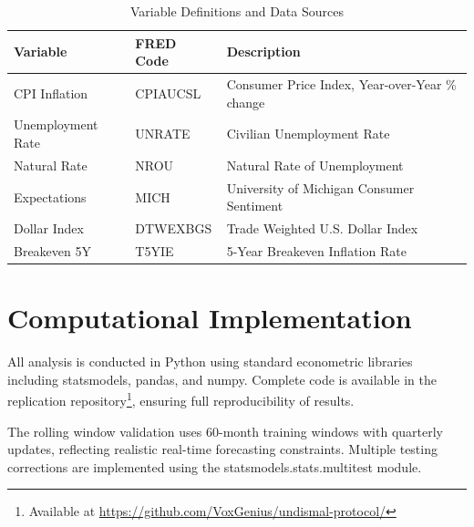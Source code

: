 \documentclass[12pt]{article}
\begin{document}
\begin{table}[H]
\centering
\caption{Variable Definitions and Data Sources}
\label{tab:variables}
\begin{tabular}{lll}
\toprule
Variable & FRED Code & Description \\
\midrule
CPI Inflation & CPIAUCSL & Consumer Price Index, Year-over-Year \% change \\
Unemployment Rate & UNRATE & Civilian Unemployment Rate \\
Natural Rate & NROU & Natural Rate of Unemployment \\
Expectations & MICH & University of Michigan Consumer Sentiment \\
Dollar Index & DTWEXBGS & Trade Weighted U.S. Dollar Index \\
Breakeven 5Y & T5YIE & 5-Year Breakeven Inflation Rate \\
\bottomrule
\end{tabular}
\end{table}

\section{Computational Implementation}

All analysis is conducted in Python using standard econometric libraries including statsmodels, pandas, and numpy. Complete code is available in the replication repository\footnote{Available at \url{https://github.com/VoxGenius/undismal-protocol/}}, ensuring full reproducibility of results.

The rolling window validation uses 60-month training windows with quarterly updates, reflecting realistic real-time forecasting constraints. Multiple testing corrections are implemented using the statsmodels.stats.multitest module.
\end{document}
